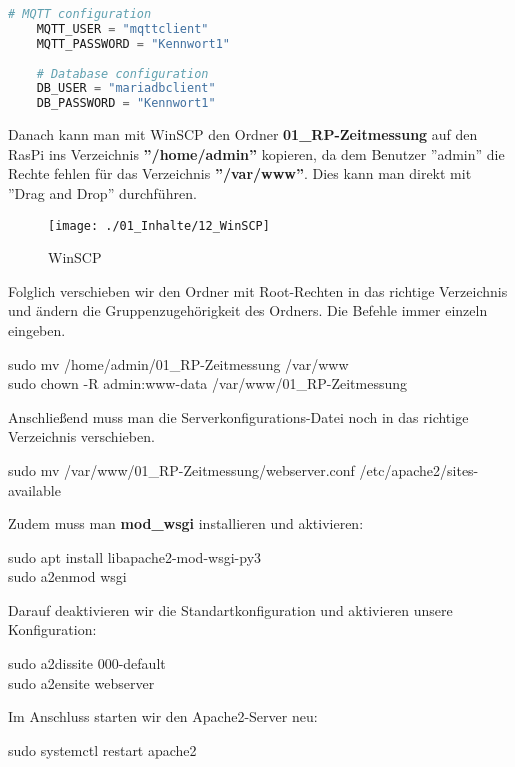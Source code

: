 \begin{lstlisting}[language=Python]
	# MQTT configuration
	MQTT_USER = "mqttclient"        
	MQTT_PASSWORD = "Kennwort1"    
	
	# Database configuration
	DB_USER = "mariadbclient"       
	DB_PASSWORD = "Kennwort1"     
\end{lstlisting}

Danach kann man mit WinSCP den Ordner \textbf{01\_RP-Zeitmessung} auf den \ac{RasPi} ins Verzeichnis \textbf{''/home/admin''} kopieren, da dem Benutzer ''admin'' die Rechte fehlen für das Verzeichnis \textbf{''/var/www''}. Dies kann man direkt mit ''Drag and Drop'' durchführen.
\begin{figure}[H]
	\centering
	\texttt{[image: ./01\_Inhalte/12\_WinSCP]}
	\caption{WinSCP}
\end{figure}

Folglich verschieben wir den Ordner mit Root-Rechten in das richtige Verzeichnis und ändern die Gruppenzugehörigkeit des Ordners. Die Befehle immer einzeln eingeben.
\begin{Textfeld1}
	sudo mv /home/admin/01\_RP-Zeitmessung /var/www \\
	sudo chown -R admin:www-data /var/www/01\_RP-Zeitmessung
\end{Textfeld1}

Anschließend muss man die Serverkonfigurations-Datei noch in das richtige Verzeichnis verschieben.
\begin{Textfeld1}
	sudo mv /var/www/01\_RP-Zeitmessung/webserver.conf /etc/apache2/sites-available
\end{Textfeld1}

Zudem muss man \textbf{mod\_wsgi} installieren und aktivieren:
\begin{Textfeld1}
	sudo apt install libapache2-mod-wsgi-py3 \\
	sudo a2enmod wsgi
\end{Textfeld1}

Darauf deaktivieren wir die Standartkonfiguration und aktivieren unsere Konfiguration:
\begin{Textfeld1}
	sudo a2dissite 000-default \\
	sudo a2ensite webserver
\end{Textfeld1}

Im Anschluss starten wir den Apache2-Server neu:
\begin{Textfeld1}
	sudo systemctl restart apache2
\end{Textfeld1}


